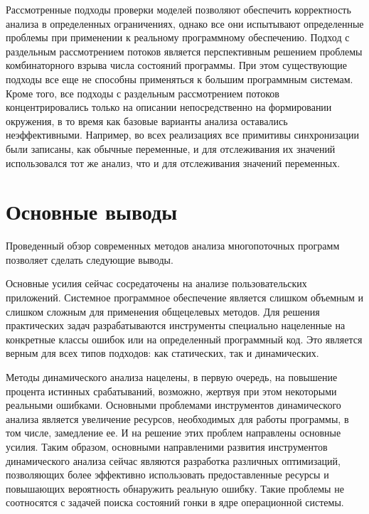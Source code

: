 Рассмотренные подходы проверки моделей позволяют обеспечить корректность анализа в определенных ограничениях, однако все они испытывают определенные проблемы при применении к реальному программному обеспечению.
Подход с раздельным рассмотрением потоков является перспективным решением проблемы комбинаторного взрыва числа состояний программы.
При этом существующие подходы все еще не способны применяться к большим программным системам.
Кроме того, все подходы с раздельным рассмотрением потоков концентрировались только на описании непосредственно на формировании окружения, в то время как базовые варианты анализа оставались неэффективными.
Например, во всех реализациях все примитивы синхронизации были записаны, как обычные переменные, и для отслеживания их значений использовался тот же анализ, что и для отслеживания значений переменных.


\section{Основные выводы}
\label{rw:conclusion}
Проведенный обзор современных методов анализа многопоточных программ позволяет сделать следующие выводы.

Основные усилия сейчас сосредаточены на анализе пользовательских приложений.
Системное программное обеспечение является слишком объемным и слишком сложным для применения общецелевых методов.
Для решения практических задач разрабатываются инструменты специально нацеленные на конкретные классы ошибок или на определенный программный код.
Это является верным для всех типов подходов: как статических, так и динамических.

Методы динамического анализа нацелены, в первую очередь, на повышение процента истинных срабатываний, возможно, жертвуя при этом некоторыми реальными ошибками.
Основными проблемами инструментов динамического анализа является увеличение ресурсов, необходимых для работы программы, в том числе, замедление ее.
И на решение этих проблем направлены основные усилия.
Таким образом, основными направленими развития инструментов динамического анализа сейчас являются разработка различных оптимизаций, позволяющих более эффективно использовать предоставленные ресурсы и повышающих вероятность обнаружить реальную ошибку.
Такие проблемы не соотносятся с задачей поиска состояний гонки в ядре операционной системы.

